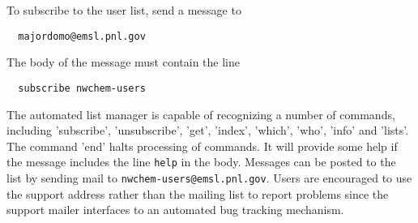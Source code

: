 To subscribe to the user list, send a message to 
\begin{verbatim}
  majordomo@emsl.pnl.gov
\end{verbatim}
The body of the message must contain the line 
\begin{verbatim}
  subscribe nwchem-users
\end{verbatim}

The automated list manager is capable of recognizing a number of
commands, including 'subscribe', 'unsubscribe', 'get', 'index',
'which', 'who', 'info' and 'lists'.  The command 'end' halts
processing of commands.  It will provide some help if the message
includes the line {\tt help} in the body.  Messages can be posted to
the list by sending mail to {\tt nwchem-users@emsl.pnl.gov}.  Users
are encouraged to use the support address rather than the mailing list
to report problems since the support mailer interfaces to an automated
bug tracking mechanism.


